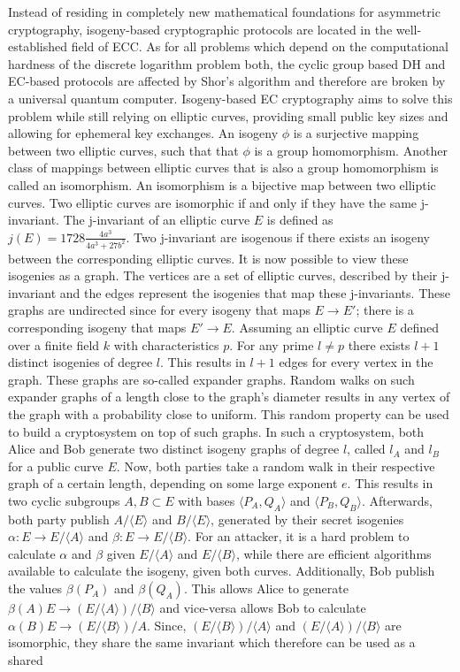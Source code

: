 Instead of residing in completely new mathematical foundations for asymmetric cryptography, isogeny-based cryptographic protocols are located in the well-established field of \ac{ECC}. As for all problems which depend on the computational hardness of the discrete logarithm problem both, the cyclic group based \ac{DH} and \ac{EC}-based protocols are affected by Shor's algorithm and therefore are broken by a universal quantum computer. Isogeny-based \ac{EC} cryptography aims to solve this problem while still relying on elliptic curves, providing small public key sizes and allowing for ephemeral key exchanges. An isogeny \(\phi\) is a surjective mapping between two elliptic curves, such that that \(\phi\) is a group homomorphism. Another class of mappings between elliptic curves that is also a group homomorphism is called an isomorphism. An isomorphism is a bijective map between two elliptic curves. Two elliptic curves are isomorphic if and only if they have the same j-invariant. The j-invariant of an elliptic curve \(E \) is defined as \(j(E) = 1728 \frac{4a^3}{4a^3 +27b^2}\). Two j-invariant are isogenous if there exists an isogeny between the corresponding elliptic curves. It is now possible to view these isogenies as a graph. The vertices are a set of elliptic curves, described by their j-invariant and the edges represent the isogenies that map these j-invariants. These graphs are undirected since for every isogeny that maps \(E \to E'\); there is a corresponding isogeny that maps \(E' \to E\). Assuming an elliptic curve \(E\) defined over a finite field \(k\) with characteristics \(p\). For any prime \(l \neq p\) there exists \(l+1\) distinct isogenies of degree \(l\). This results in \(l+1\) edges for every vertex in the graph. These graphs are so-called expander graphs. Random walks on such expander graphs of a length close to the graph's diameter results in any vertex of the graph with a probability close to uniform. This random property can be used to build a cryptosystem on top of such graphs. In such a cryptosystem, both Alice and Bob generate two distinct isogeny graphs of degree \(l\), called \(l_A\) and \(l_B\) for a public curve \(E\). Now, both parties take a random walk in their respective graph of a certain length, depending on some large exponent \(e\). This results in two cyclic subgroups \(A, B \subset E\) with bases \(\langle P_A, Q_A \rangle\) and \(\langle P_B, Q_B \rangle\). Afterwards, both party publish \(A/ \langle E \rangle \) and \(B/ \langle E \rangle \), generated by their secret isogenies \(\alpha: E \to E/\langle A \rangle \) and \(\beta: E \to E/ \langle B \rangle\). For an attacker, it is a hard problem to calculate \(\alpha\) and \(\beta\) given \(E/ \langle A \rangle\) and \(E/ \langle B \rangle\), while there are efficient algorithms available to calculate the isogeny, given both curves. Additionally, Bob publish the values \(\beta(P_A)\) and \(\beta(Q_A)\). This allows Alice to generate \(\beta(A) E \to (E/\langle A \rangle)/ \langle B \rangle\) and vice-versa allows Bob to calculate \(\alpha(B) E \to (E/ \langle B \rangle )/A\). Since, \((E/ \langle B\rangle )/ \langle A \rangle\) and \((E/\langle A \rangle)/ \langle B \rangle\) are isomorphic, they share the same invariant which therefore can be used as a shared 